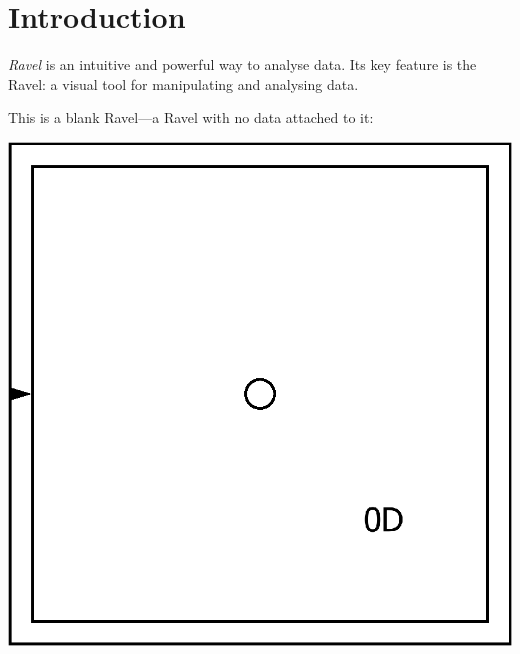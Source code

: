 
\chapter{Introduction}

\label{Introduction} \emph{Ravel} is an intuitive and powerful way
to analyse data. Its key feature is the Ravel: a visual tool for manipulating
and analysing data.

This is a blank Ravel---a Ravel with no data attached to it:

\includegraphics{images/RavelBlank}

